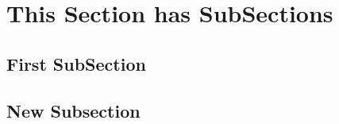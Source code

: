 \documentclass[letterpaper,twocolumn,10pt]{article}
\begin{document}

\section{This Section has SubSections}
\subsection{First SubSection}

%
%

\subsection{New Subsection}
\end{document}
